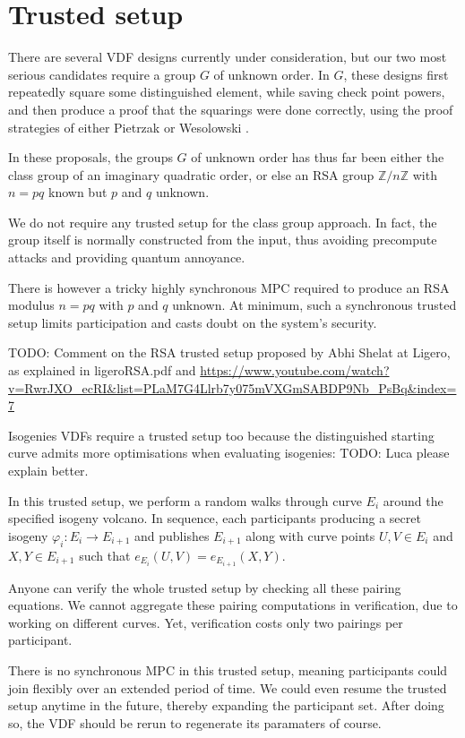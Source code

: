 \documentclass{article}
\newcommand{\Z}{\mathbb{Z}}
\begin{document}
\section{Trusted setup}

There are several VDF designs currently under consideration, but
our two most serious candidates require a group $G$ of unknown order.
In $G$, these designs first repeatedly square some distinguished
element, while saving check point powers, and then produce a proof
that the squarings were done correctly, using the proof strategies
of either Pietrzak \cite{Pietrzak} or Wesolowski \cite{Wesolowski}.

In these proposals, the groups $G$ of unknown order has thus far been
either the class group of an imaginary quadratic order, or else an
RSA group $\Z/n\Z$ with $n = p q$ known but $p$ and $q$ unknown.

We do not require any trusted setup for the class group approach.
In fact, the group itself is normally constructed from the input,
thus avoiding precompute attacks and providing quantum annoyance.  

There is however a tricky highly synchronous MPC required to produce
an RSA modulus $n = p q$ with $p$ and $q$ unknown.  At minimum, such
a synchronous trusted setup limits participation and casts doubt on
the system's security.  

TODO: Comment on the RSA trusted setup proposed by Abhi Shelat at Ligero, as explained in ligeroRSA.pdf and  \url{https://www.youtube.com/watch?v=RwrJXO_ecRI&list=PLaM7G4Llrb7y075mVXGmSABDP9Nb_PsBq&index=7}

Isogenies VDFs require a trusted setup too because the distinguished
starting curve admits more optimisations when evaluating isogenies:
TODO: Luca please explain better.

In this trusted setup, we perform a random walks through curve $E_i$
around the specified isogeny volcano.  In sequence, each participants
producing a secret isogeny $φ_i : E_i \to E_{i+1}$ and publishes
$E_{i+1}$ along with curve points $U,V \in E_i$ and $X,Y \in E_{i+1}$
such that $e_{E_i}(U,V) = e_{E_{i+1}}(X,Y)$.  

Anyone can verify the whole trusted setup by checking all these
pairing equations.  We cannot aggregate these pairing computations
in verification, due to working on different curves.  Yet, verification
costs only two pairings per participant.

There is no synchronous MPC in this trusted setup, meaning participants
could join flexibly over an extended period of time.  We could even
resume the trusted setup anytime in the future, thereby expanding the
participant set.  After doing so, the VDF should be rerun to
regenerate its paramaters of course.
\end{document}

